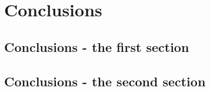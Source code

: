 \chapter{Conclusions}
    \blindtext[10]
    \newpage
    \section{Conclusions - the first section}
        \blindtext[10] 
        \newpage
    \section{Conclusions - the second section}
        \blindtext[10] 
        \newpage